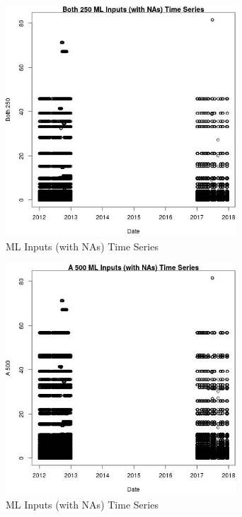\begin{figure} 
\centering  
\includegraphics[width=0.77\textwidth]{Code_Outputs/Report_ML_input_PM25_Step4_part_e_de_duplicated_aves_compiled_2019-05-14wNAs_Both_250vDate.jpg} 
\caption{\label{fig:Report_ML_input_PM25_Step4_part_e_de_duplicated_aves_compiled_2019-05-14wNAsBoth_250vDate}ML Inputs (with NAs) Time Series} 
\end{figure} 
 

\begin{figure} 
\centering  
\includegraphics[width=0.77\textwidth]{Code_Outputs/Report_ML_input_PM25_Step4_part_e_de_duplicated_aves_compiled_2019-05-14wNAs_A_500vDate.jpg} 
\caption{\label{fig:Report_ML_input_PM25_Step4_part_e_de_duplicated_aves_compiled_2019-05-14wNAsA_500vDate}ML Inputs (with NAs) Time Series} 
\end{figure} 
 

